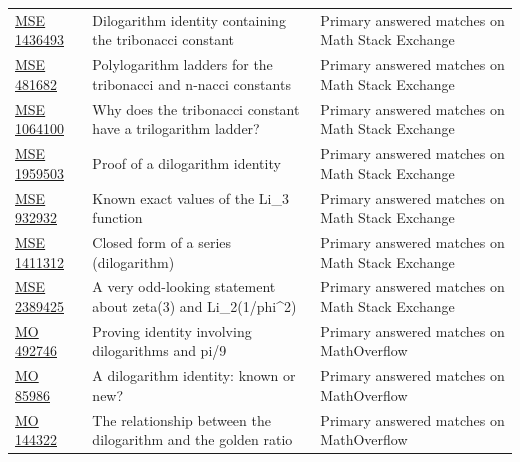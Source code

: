 \begin{longtable}{@{}p{}p{}p{}@{}}
\href{https://math.stackexchange.com/questions/1436493/dilogarithm-identity-containing-the-tribonacci-constant}{MSE 1436493} & Dilogarithm identity containing the tribonacci constant & Primary answered matches on Math Stack Exchange\\
\href{https://math.stackexchange.com/questions/481682/polylogarithm-ladders-for-the-tribonacci-and-n-nacci-constants}{MSE 481682} & Polylogarithm ladders for the tribonacci and n-nacci constants & Primary answered matches on Math Stack Exchange\\
\href{https://math.stackexchange.com/questions/1064100/why-does-the-tribonacci-constant-have-a-trilogarithm-ladder}{MSE 1064100} & Why does the tribonacci constant have a trilogarithm ladder? & Primary answered matches on Math Stack Exchange\\
\href{https://math.stackexchange.com/questions/1959503/proof-of-a-dilogarithm-identity}{MSE 1959503} & Proof of a dilogarithm identity & Primary answered matches on Math Stack Exchange\\
\href{https://math.stackexchange.com/questions/932932/known-exact-values-of-the-operatornameli-3-function}{MSE 932932} & Known exact values of the Li\_3 function & Primary answered matches on Math Stack Exchange\\
\href{https://math.stackexchange.com/questions/1411312/closed-form-of-a-series-dilogarithm}{MSE 1411312} & Closed form of a series (dilogarithm) & Primary answered matches on Math Stack Exchange\\
\href{https://math.stackexchange.com/questions/2389425/a-very-odd-looking-statement-about-zeta3-and-textli-2-left-frac1-va}{MSE 2389425} & A very odd-looking statement about zeta(3) and Li\_2(1/phi\textasciicircum{}2) & Primary answered matches on Math Stack Exchange\\
\href{https://mathoverflow.net/questions/492746/proving-identity-involving-dilogarithms-and-pi-9}{MO 492746} & Proving identity involving dilogarithms and pi/9 & Primary answered matches on MathOverflow\\
\href{https://mathoverflow.net/questions/85986/a-dilogarithm-identity-known-or-new}{MO 85986} & A dilogarithm identity: known or new? & Primary answered matches on MathOverflow\\
\href{https://mathoverflow.net/questions/144322/the-relationship-between-the-dilogarithm-and-the-golden-ratio}{MO 144322} & The relationship between the dilogarithm and the golden ratio & Primary answered matches on MathOverflow\\

\end{longtable}
